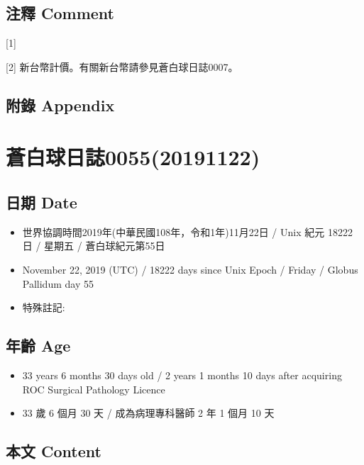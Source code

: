 \documentclass[a5paper, 12pt
]{book}
\providecommand{\tightlist}{%
  \setlength{\itemsep}{0pt}\setlength{\parskip}{0pt}}
\begin{document}
\hypertarget{ux6ce8ux91cb-comment-47}{%
\subsection{注釋 Comment}\label{ux6ce8ux91cb-comment-47}}

{[}1{]}

{[}2{]} 新台幣計價。有關新台幣請參見蒼白球日誌0007。

\hypertarget{ux9644ux9304-appendix-46}{%
\subsection{附錄 Appendix}\label{ux9644ux9304-appendix-46}}

\hypertarget{ux84bcux767dux7403ux65e5ux8a8c005520191122}{%
\section{蒼白球日誌0055(20191122)}\label{ux84bcux767dux7403ux65e5ux8a8c005520191122}}

\hypertarget{ux65e5ux671f-date-54}{%
\subsection{日期 Date}\label{ux65e5ux671f-date-54}}

\begin{itemize}
\tightlist
\item
  世界協調時間2019年(中華民國108年，令和1年)11月22日 / Unix 紀元 18222
  日 / 星期五 / 蒼白球紀元第55日
\item
  November 22, 2019 (UTC) / 18222 days since Unix Epoch / Friday /
  Globus Pallidum day 55
\item
  特殊註記:
\end{itemize}

\hypertarget{ux5e74ux9f61-age-54}{%
\subsection{年齡 Age}\label{ux5e74ux9f61-age-54}}

\begin{itemize}
\tightlist
\item
  33 years 6 months 30 days old / 2 years 1 months 10 days after
  acquiring ROC Surgical Pathology Licence
\item
  33 歲 6 個月 30 天 / 成為病理專科醫師 2 年 1 個月 10 天
\end{itemize}

\hypertarget{ux672cux6587-content-54}{%
\subsection{本文 Content}\label{ux672cux6587-content-54}}
\end{document}
